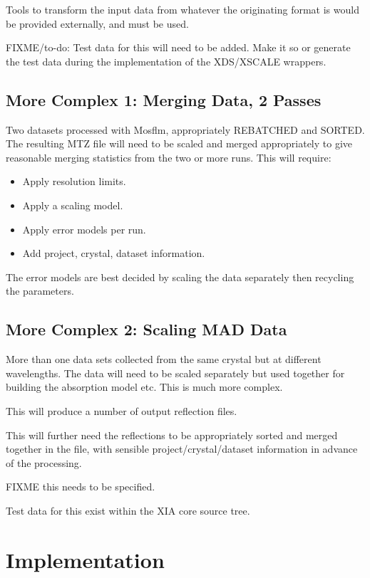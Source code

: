 \documentclass[a4paper, 11pt]{article}
\begin{document}
Tools to transform the input data from whatever the originating format is
would be provided externally, and must be used.

FIXME/to-do: Test data for this will need to be added. Make it so or generate
the test data during the implementation of the XDS/XSCALE wrappers.

\subsection{More Complex 1: Merging Data, 2 Passes}

Two datasets processed with Mosflm, appropriately REBATCHED and SORTED. The
resulting MTZ file will need to be scaled and merged appropriately to give
reasonable merging statistics from the two or more runs. This will require:

\begin{itemize}
\item{Apply resolution limits.}
\item{Apply a scaling model.}
\item{Apply error models per run.}
\item{Add project, crystal, dataset information.}
\end{itemize}

The error models are best decided by scaling the data separately then 
recycling the parameters.

\subsection{More Complex 2: Scaling MAD Data}

More than one data sets collected from the same crystal but at different 
wavelengths. The data will need to be scaled separately but used together
for building the absorption model etc. This is much more complex.

This will produce a number of output reflection files.

This will further need the reflections to be appropriately sorted and 
merged together in the file, with sensible project/crystal/dataset information
in advance of the processing.

FIXME this needs to be specified.

Test data for this exist within the XIA core source tree.

\section{Implementation}
\end{document}
